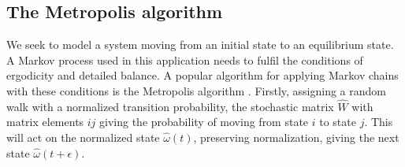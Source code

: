 \documentclass[10pt,a4paper]{article}
\begin{document}
\subsection{The Metropolis algorithm}
We seek to model a system moving from an initial state to an equilibrium state. A Markov process used in this application needs to fulfil the conditions of ergodicity and detailed balance. A popular algorithm for applying Markov chains with these conditions is the Metropolis algorithm \cite{Lecture_Notes_Fall_2015}. Firstly, assigning a random walk with a normalized transition probability, the stochastic matrix $\hat{W}$ with matrix elements $ij$ giving the probability of moving from state $i$ to state $j$. This will act on the normalized state $\hat{\omega}(t)$, preserving normalization, giving the next state $\hat{\omega}(t+\epsilon)$.
\end{document}
